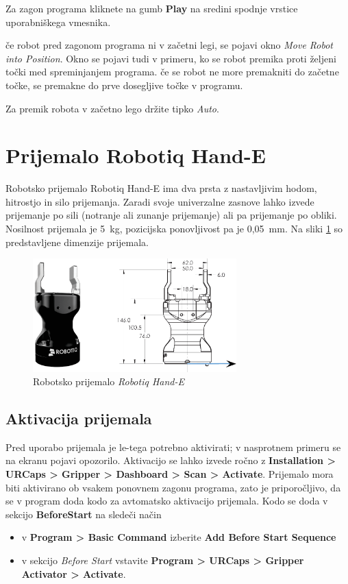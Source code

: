 Za zagon programa kliknete na gumb  \textbf{Play} na sredini spodnje vrstice uporabniškega vmesnika.

če robot pred zagonom programa ni v začetni legi, se pojavi okno \emph{Move Robot into Position}. Okno se pojavi tudi v primeru, ko se robot premika proti željeni točki med spreminjanjem programa. če se robot ne more premakniti do začetne točke, se premakne do prve dosegljive točke v programu.

Za premik robota v začetno lego držite tipko \emph{Auto}.


\section{Prijemalo Robotiq Hand-E}

Robotsko prijemalo Robotiq Hand-E ima dva prsta z nastavljivim hodom, hitrostjo in silo prijemanja. Zaradi svoje univerzalne zasnove lahko izvede prijemanje po sili  (notranje ali zunanje prijemanje) ali pa prijemanje po obliki. Nosilnost prijemala je 5~kg, pozicijska ponovljivost pa je 0,05~mm. Na sliki \ref{fig:ur_gripper} so predstavljene dimenzije prijemala.

\begin{figure}[!hbt]
\centering
\includegraphics[width=0.7\textwidth]{ur5e_gripper.eps}
\caption{Robotsko prijemalo \emph{Robotiq Hand-E}}
\label{fig:ur_gripper}
\end{figure}

\subsection{Aktivacija prijemala}

Pred uporabo prijemala je le-tega potrebno  aktivirati; v nasprotnem primeru se na ekranu pojavi opozorilo. Aktivacijo se lahko izvede ročno z \textbf{Installation > URCaps > Gripper > Dashboard > Scan > Activate}.  Prijemalo mora biti aktivirano ob vsakem ponovnem zagonu programa, zato je priporočljivo, da se v program doda kodo za avtomatsko aktivacijo prijemala. Kodo se doda v sekcijo \textbf{BeforeStart} na sledeči način
\begin{itemize}
    \item v \textbf{Program > Basic Command} izberite \textbf{Add Before Start Sequence}
    \item v sekcijo \emph{Before Start} vstavite \textbf{Program > URCaps > Gripper Activator > Activate}.
\end{itemize}

